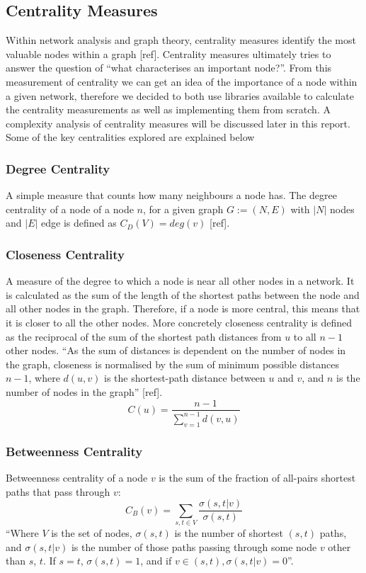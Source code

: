\documentclass[9pt]{article}
\begin{document}
\subsection{Centrality Measures}
Within network analysis and graph theory, centrality measures identify the most valuable nodes within a graph [ref]. Centrality measures ultimately tries to answer the question of  “what characterises an important node?”. From this measurement of centrality we can get an idea of the importance of a node within a given network, therefore we decided to both use libraries available to calculate the centrality measurements as well as implementing them from scratch. A complexity analysis of centrality measures will be discussed later in this report. Some of the key centralities explored are explained below

\subsubsection{Degree Centrality}
A simple measure that counts how many neighbours a node has. The degree centrality of a node of a node \(n\), for a given graph \(G:=(N,E)\) with \(|N|\) nodes and \(|E|\) edge is defined as \(C_D(V) = deg(v)\) [ref]. 

\subsubsection{Closeness Centrality}
A measure of the degree to which a node is near all other nodes in a network. It is calculated as the sum of the length of the shortest paths between the node and all other nodes in the graph. Therefore, if a node is more central, this means that it is closer to all the other nodes. More concretely closeness centrality is defined as the reciprocal of the sum of the shortest path distances from \(u\) to all \(n-1\) other nodes. “As the sum of distances is dependent on the number of nodes in the graph, closeness is normalised by the sum of minimum possible distances \(n-1\),  where \(d(u, v)\) is the shortest-path distance between \(u\) and \(v\), and \(n\) is the number of nodes in the graph” [ref]. 
\begin{equation}
C(u)=\frac{n-1}{\sum_{v=1}^{n-1} d(v,u)}
\end{equation}

\subsubsection{Betweenness Centrality}
Betweenness centrality of a node \(v\) is the sum of the fraction of all-pairs shortest paths that pass through \(v\):
\begin{equation}
C_B(v)=\sum_{s,t\in{V}}\frac{\sigma(s, t|v)}{\sigma(s, t)}
\end{equation}
“Where \(V\) is the set of nodes, \(\sigma(s, t)\) is the number of shortest \((s, t)\) paths, and \(\sigma(s, t|v)\) is the number of those paths passing through some node \(v\) other than \(s\), \(t\). If \(s = t\), \(\sigma(s, t) = 1\), and if \(v \in (s, t), \sigma(s, t|v) = 0\)”.
\end{document}
